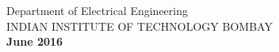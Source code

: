 \begin{titlepage}
\begin{center}
	
	\vspace{-0.2in}
	\large{%
	Department of Electrical Engineering\\
	INDIAN INSTITUTE OF TECHNOLOGY BOMBAY\\
	\textbf{June 2016}
	}

	\end{center}
\end{titlepage}
